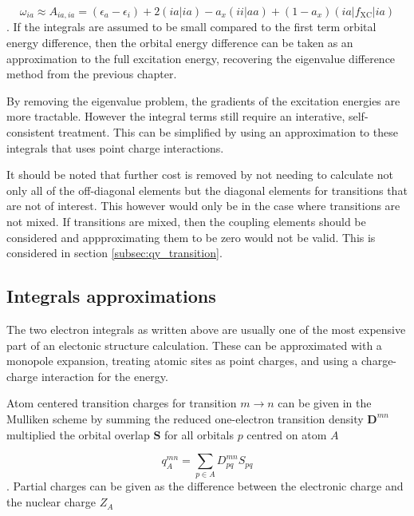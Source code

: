 \begin{equation}
\omega_{ia} \approx A_{ia, ia} = \left( \epsilon_a - \epsilon_i \right) + 2\left(ia|ia\right) - a_x\left(ii|aa\right) + (1- a_x)\left(ia|f_{\text{XC}}|ia\right) 
\label{eq:diag_dom}
\end{equation}
%
. If the integrals are assumed to be small compared to the first term orbital energy
difference, then the orbital energy difference can be taken as an approximation 
to the full excitation energy, recovering the eigenvalue difference method from
the previous chapter.

By removing the eigenvalue problem, the gradients of the excitation energies are
more tractable. However the integral terms still require an interative, self-consistent
treatment. This can be simplified by using an approximation to these integrals that
uses point charge interactions.

It should be noted that further cost is removed by not needing to calculate not
only all of the off-diagonal elements but the diagonal elements for transitions
that are not of interest. This however would only be in the case where transitions
are not mixed. If transitions are mixed, then the coupling elements should be considered
and appproximating them to be zero would not be valid. This is considered in section
\ref{subsec:qy_transition}.

\subsection{Integrals approximations}
\label{subsec:MNOK}

The two electron integrals as written above are usually one of the most expensive
part of an electonic structure calculation. These can be approximated with a monopole
expansion, treating atomic sites as point charges, and using a charge-charge interaction 
for the energy.

Atom centered transition charges for transition $m \rightarrow n$ can be given in
the Mulliken scheme by summing the reduced one-electron transition density 
$\mathbf{D}^{mn}$ multiplied the orbital overlap $\mathbf{S}$ for all orbitals $p$ 
centred on atom $A$

\begin{equation}
q^{mn}_A = \sum_{p \in A} D^{mn}_{pq} S_{pq}  
\end{equation}
%
. Partial charges can be given as the difference between the electronic charge
and the nuclear charge $Z_A$

